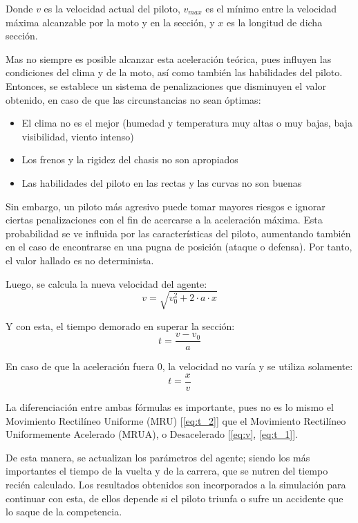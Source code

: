 \documentclass[12pt, letterpaper,spanish]{article}
\theoremstyle{definition}
\theoremstyle{remark}
\begin{document}
		Donde $v$ es la velocidad actual del piloto, $v_{max}$ es el mínimo entre la velocidad máxima alcanzable por la moto y en la sección, y $x$ es la longitud de dicha sección.

		Mas no siempre es posible alcanzar esta aceleración teórica, pues influyen las condiciones del clima y de la moto, así como también las habilidades del piloto. Entonces, se establece un sistema de penalizaciones que disminuyen el valor obtenido, en caso de que las circunstancias no sean óptimas:
		\begin{itemize}
			\item El clima no es el mejor (humedad y temperatura muy altas o muy bajas, baja visibilidad, viento intenso)
			\item Los frenos y la rigidez del chasis no son apropiados
			\item Las habilidades del piloto en las rectas y las curvas no son buenas
		\end{itemize}

		Sin embargo, un piloto más agresivo puede tomar mayores riesgos e ignorar ciertas penalizaciones con el fin de acercarse a la aceleración máxima. Esta probabilidad se ve influida por las características del piloto, aumentando también en el caso de encontrarse en una pugna de posición (ataque o defensa). Por tanto, el valor hallado es no determinista.

		Luego, se calcula la nueva velocidad del agente:
		\begin{equation}\label{eq:v}
		v=\sqrt{v_{0}^{2} + 2 \cdot a \cdot x}
		\end{equation}

		Y con esta, el tiempo demorado en superar la sección:
		\begin{equation}\label{eq:t_1}
		t=\frac{v - v_{0}}{a}
		\end{equation}

		En caso de que la aceleración fuera $0$, la velocidad no varía y se utiliza solamente:
		\begin{equation}\label{eq:t_2}
		t=\frac{x}{v}
		\end{equation}

		La diferenciación entre ambas fórmulas es importante, pues no es lo mismo el Movimiento Rectilíneo Uniforme (MRU) [\ref{eq:t_2}] que el Movimiento Rectilíneo Uniformemente Acelerado (MRUA), o Desacelerado [\ref{eq:v}, \ref{eq:t_1}].

		De esta manera, se actualizan los parámetros del agente; siendo los más importantes el tiempo de la vuelta y de la carrera, que se nutren del tiempo recién calculado. Los resultados obtenidos son incorporados a la simulación para continuar con esta, de ellos depende si el piloto triunfa o sufre un accidente que lo saque de la competencia.
\end{document}
